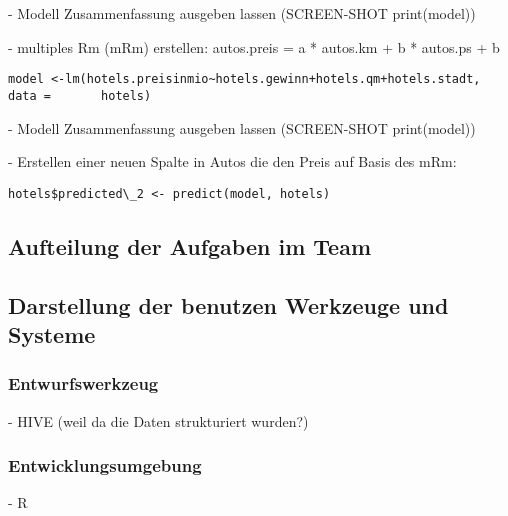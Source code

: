 - Modell Zusammenfassung ausgeben lassen (SCREEN-SHOT print(model))


- multiples Rm (mRm) erstellen: autos.preis = a * autos.km + b * autos.ps + b
\begin{lstlisting}
model <-lm(hotels.preisinmio~hotels.gewinn+hotels.qm+hotels.stadt, data =       hotels)
\end{lstlisting}

- Modell Zusammenfassung ausgeben lassen (SCREEN-SHOT print(model))


- Erstellen einer neuen Spalte in Autos die den Preis auf Basis des mRm:
\begin{lstlisting}
hotels$predicted\_2 <- predict(model, hotels)
\end{lstlisting}


\subsection*{Aufteilung der Aufgaben im Team}
\subsection*{Darstellung der benutzen Werkzeuge und Systeme}
\subsubsection*{Entwurfswerkzeug}
- HIVE (weil da die Daten strukturiert wurden?)

\subsubsection*{Entwicklungsumgebung}
- R

